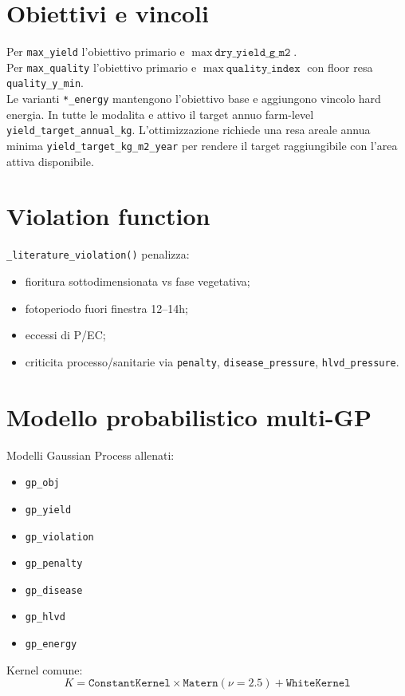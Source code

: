﻿\documentclass[11pt,a4paper]{report}
\begin{document}
\section{Obiettivi e vincoli}
Per \texttt{max\_yield} l'obiettivo primario e \(\max\ \texttt{dry\_yield\_g\_m2}\).\\
Per \texttt{max\_quality} l'obiettivo primario e \(\max\ \texttt{quality\_index}\) con floor resa \texttt{quality\_y\_min}.\\
Le varianti \texttt{*\_energy} mantengono l'obiettivo base e aggiungono vincolo hard energia.
In tutte le modalita e attivo il target annuo farm-level \texttt{yield\_target\_annual\_kg}.
L'ottimizzazione richiede una resa areale annua minima \texttt{yield\_target\_kg\_m2\_year}
per rendere il target raggiungibile con l'area attiva disponibile.

\section{Violation function}
\texttt{\_literature\_violation()} penalizza:
\begin{itemize}
  \item fioritura sottodimensionata vs fase vegetativa;
  \item fotoperiodo fuori finestra 12--14h;
  \item eccessi di P/EC;
  \item criticita processo/sanitarie via \texttt{penalty}, \texttt{disease\_pressure}, \texttt{hlvd\_pressure}.
\end{itemize}

\section{Modello probabilistico multi-GP}
Modelli Gaussian Process allenati:
\begin{itemize}
  \item \texttt{gp\_obj}
  \item \texttt{gp\_yield}
  \item \texttt{gp\_violation}
  \item \texttt{gp\_penalty}
  \item \texttt{gp\_disease}
  \item \texttt{gp\_hlvd}
  \item \texttt{gp\_energy}
\end{itemize}
Kernel comune:
\[
K = \texttt{ConstantKernel} \times \texttt{Matern}(\nu=2.5) + \texttt{WhiteKernel}
\]
\end{document}
